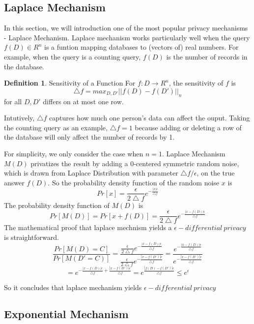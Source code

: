\documentclass[a4paper, 11pt]{article} %
\theoremstyle{definition}
\newtheorem{definition}{Definition}[section]
\begin{document}
\subsection{Laplace Mechanism}
In this section, we will introduction one of the most popular privacy mechanisms - Laplace Mechanism\cite{dwork2006calibrating}. Laplace mechanism works particularly well when the query $f(D)\in R^n$ is a funtion mapping databases to (vectors of) real numbers. For example, when the query is a counting query, $f(D)$ is the number of records in the database.
\begin{definition}{Sensitivity of a Function}
For $f: D\rightarrow R^n$, the sensitivity of $f$ is 
	\[  \bigtriangleup f = max_{D, D\prime} ||f(D) - f(D\prime)||_n \]
	for all $D, D\prime$ differs on at most one row.
\end{definition}
Intutively, $\bigtriangleup f$ captures how much one person's data can affect the ouput. Taking the counting query as an example, $\bigtriangleup f = 1$ because adding or deleting a row of the database will only affect the number of records by 1. 

For simplicity, we only consider the case when $n=1$. Laplace Mechanism $M(D)$ privatizes the result by adding a 0-centered symmetric random noise, which is drawn from Laplace Distribution\cite{simon1774memoire} with parameter $\bigtriangleup f / \epsilon$,  on the true answer $f(D)$. So the probability density function of the random noise $x$ is
   \[ Pr[x] = \frac{\epsilon}{2\bigtriangleup f}e^{-\frac{|x|\epsilon}{\bigtriangleup f}}  \]
The probability density function of $M(D)$ is
  \[ Pr[M(D)] = Pr[x+f(D)] = \frac{\epsilon}{2\bigtriangleup f}e^{-\frac{|x-f(D)|\epsilon}{\bigtriangleup f}}  \]
  The mathematical proof that laplace mechnism yields a $\epsilon - differential \ privacy$ is straightforward. 
  \[ \frac{Pr[M(D) = C]}{Pr[M(D\prime = C)]} = \frac{\frac{\epsilon}{2\bigtriangleup f}e^{-\frac{|x-f(D)|\epsilon}{\bigtriangleup f}} }{\frac{\epsilon}{2\bigtriangleup f}e^{-\frac{|x-f(D\prime)|\epsilon}{\bigtriangleup f}} } = \frac{e^{-\frac{|x-f(D)|\epsilon}{\bigtriangleup f}} }{e^{-\frac{|x-f(D\prime)|\epsilon}{\bigtriangleup f}} } \] \[= e^{-\frac{|x-f(D)|\epsilon}{\bigtriangleup f} + \frac{|x-f(D\prime)|\epsilon}{\bigtriangleup f} } = e^{\frac{|f(D) - f(D\prime)|\epsilon}{\bigtriangleup f}} \leq e^\epsilon \]
  
So it concludes that laplace mechanism yields $\epsilon - differential \ privacy$
\subsection{Exponential Mechanism}
\end{document}
